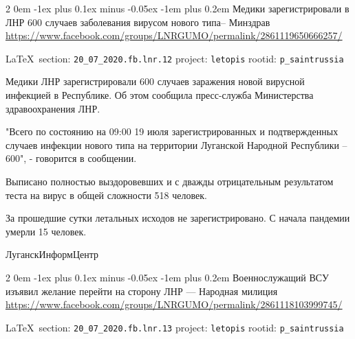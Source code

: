 \documentclass[a4paper,11pt]{extreport}
\makeatletter
\renewcommand\subsection{%
  \clearpage
    \@startsection{subsection}%
    {2}%
    {0em}%
    {-1ex plus 0.1ex minus -0.05ex}%
    {-1em plus 0.2em}%
    {\scshape\bfseries\Large}%
}
\makeatother
\begin{document}
 
 

\subsection{Медики зарегистрировали в ЛНР 600 случаев заболевания вирусом нового типа– Минздрав}
\label{sec:20_07_2020.fb.lnr.12}
\url{https://www.facebook.com/groups/LNRGUMO/permalink/2861119650666257/}
  
\vspace{0.5cm}
{\small\LaTeX~section: \verb|20_07_2020.fb.lnr.12| project: \verb|letopis| rootid: \verb|p_saintrussia|}
\vspace{0.5cm}

Медики ЛНР зарегистрировали 600 случаев заражения новой вирусной инфекцией в
Республике. Об этом сообщила пресс-служба Министерства здравоохранения ЛНР.

"Всего по состоянию на 09:00 19 июля зарегистрированных и подтвержденных
случаев инфекции нового типа на территории Луганской Народной Республики –
600", - говорится в сообщении.

Выписано полностью выздоровевших и с дважды отрицательным результатом теста на
вирус в общей сложности 518 человек.

За прошедшие сутки летальных исходов не зарегистрировано. С начала пандемии
умерли 15 человек.

ЛуганскИнформЦентр 
 
 

\subsection{Военнослужащий ВСУ изъявил желание перейти на сторону ЛНР --- Народная милиция}
\label{sec:20_07_2020.fb.lnr.13}
\url{https://www.facebook.com/groups/LNRGUMO/permalink/2861118103999745/}
  
\vspace{0.5cm}
{\small\LaTeX~section: \verb|20_07_2020.fb.lnr.13| project: \verb|letopis| rootid: \verb|p_saintrussia|}
\vspace{0.5cm}
\end{document}
